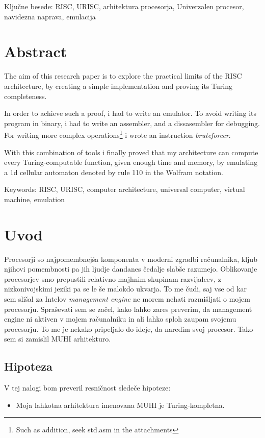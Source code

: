 \documentclass[12pt]{article}
\begin{document}
Ključne besede: RISC, URISC, arhitektura procesorja, Univerzalen procesor, navidezna naprava, emulacija

\pagebreak

\section{Abstract}
The aim of this research paper is to explore the practical limits of the RISC architecture, by creating a simple implementation and proving its Turing completeness.

In order to achieve such a proof, i had to write an emulator.
To avoid writing its program in binary, i had to write an assembler, and a dissasembler for debugging.
For writing more complex operations\footnote{Such as addition, seek std.asm in the attachments} i wrote an instruction \textit{bruteforcer}.

With this combination of tools i finally proved that my architecture can compute every Turing-computable function, given enough time and memory, by emulating a 1d cellular automaton denoted by rule 110 in the Wolfram notation.

Keywords: RISC, URISC, computer architecture, universal computer, virtual machine, emulation

\pagebreak

\section{Uvod}
Procesorji so najpomembnejša komponenta v moderni zgradbi računalnika, kljub njihovi pomembnosti pa jih ljudje dandanes čedalje slabše razumejo.
Oblikovanje procesorjev smo prepustili relativno majhnim skupinam razvijalcev, z nizkonivojskimi jeziki pa se le še malokdo ukvarja.
To me čudi, saj vse od kar sem slišal za Intelov \textit{management engine} ne morem nehati razmišljati o mojem procesorju.
Spraševati sem se začel, kako lahko zares preverim, da management engine ni aktiven v mojem računalniku in ali lahko sploh zaupam svojemu procesorju.
To me je nekako pripeljalo do ideje, da naredim svoj procesor.
Tako sem si zamislil MUHI arhitekturo.

\subsection{Hipoteza}
V tej nalogi bom preveril resničnost sledeče hipoteze:
\begin{itemize}
  \item Moja lahkotna arhitektura imenovana MUHI je Turing-kompletna.
\end{itemize}
\end{document}
